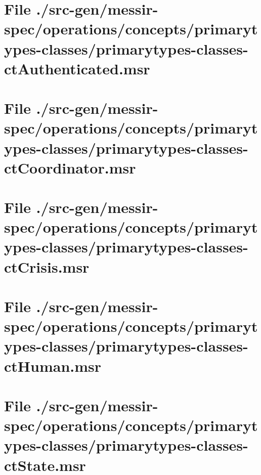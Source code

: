 \section[File /src-gen/messir-spec.../primarytypes-classes-ctAuthenticated.msr]{File ./src-gen/messir-spec/operations/concepts/primarytypes-classes/primarytypes-classes-ctAuthenticated.msr}
\scriptsize

\normalsize
	
\section[File /src-gen/messir-spec/operations.../primarytypes-classes-ctCoordinator.msr]{File ./src-gen/messir-spec/operations/concepts/primarytypes-classes/primarytypes-classes-ctCoordinator.msr}
\scriptsize

\normalsize
	
\section[File /src-gen/messir-spec/operations.../primarytypes-classes-ctCrisis.msr]{File ./src-gen/messir-spec/operations/concepts/primarytypes-classes/primarytypes-classes-ctCrisis.msr}
\scriptsize

\normalsize
	
\section[File /src-gen/messir-spec/operations.../primarytypes-classes-ctHuman.msr]{File ./src-gen/messir-spec/operations/concepts/primarytypes-classes/primarytypes-classes-ctHuman.msr}
\scriptsize

\normalsize
	
\section[File /src-gen/messir-spec/operations.../primarytypes-classes-ctState.msr]{File ./src-gen/messir-spec/operations/concepts/primarytypes-classes/primarytypes-classes-ctState.msr}
\scriptsize

\normalsize
	
